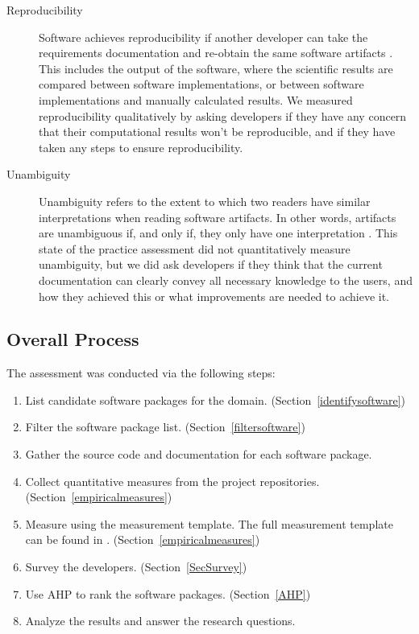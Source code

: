 \documentclass[final, 3p, times, authoryear]{elsarticle}
\begin{document}
\begin{description}
	\item[Reproducibility] Software achieves reproducibility if another
	developer can take the requirements documentation and re-obtain the same
	software artifacts \citep{BenureauAndRougier2017}. This includes the output
	of the software, where the scientific results are compared between software
	implementations, or between software implementations and manually calculated
	results. We measured reproducibility qualitatively by asking developers if
	they have any concern that their computational results won't be
	reproducible, and if they have taken any steps to ensure reproducibility.
	
	\item[Unambiguity] Unambiguity refers to the extent to which two readers
	have similar interpretations when reading software artifacts. In other
	words, artifacts are unambiguous if, and only if, they only have one
	interpretation \citep{IEEE1998}. This state of the practice assessment did
	not quantitatively measure unambiguity, but we did ask developers if they
	think that the current documentation can clearly convey all necessary
	knowledge to the users, and how they achieved this or what improvements are
	needed to achieve it.
				 
\end{description}

\subsection{Overall Process} \label{Sec_OverallProcess}

The assessment was conducted via the following steps: 

\begin{enumerate}
	\item List candidate software packages for the domain.
	(Section~\ref{identifysoftware})
	\item Filter the software package list. (Section~\ref{filtersoftware})
	\item Gather the source code and documentation for each software package.
	\item Collect quantitative measures from the project repositories.
	(Section~\ref{empiricalmeasures})
	\item Measure using the measurement template.  The full measurement template
	can be found in \citet{SmithEtAl2021}. (Section~\ref{empiricalmeasures})
	\item Survey the developers. (Section~\ref{SecSurvey})
	\item Use AHP to rank the software packages. (Section~\ref{AHP})
	\item Analyze the results and answer the research questions.
\end{enumerate}
\end{document}
